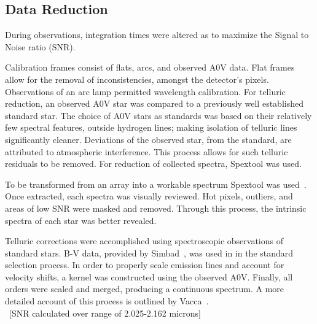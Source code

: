 \subsection{Data Reduction}

During observations, integration times were altered as to maximize the Signal to Noise ratio (SNR).

Calibration frames consist of flats, arcs, and observed A0V data.  Flat frames allow for the removal of inconsistencies, amongst the detector's pixels.  Observations of an arc lamp permitted wavelength calibration.  For telluric reduction, an observed A0V star was compared to a previously well established standard star.  The choice of A0V stars as standards was based on their relatively few spectral features, outside hydrogen lines; making isolation of telluric lines significantly cleaner.  
Deviations of the observed star, from the standard, are attributed to atmospheric interference.  This process allows for such telluric residuals to be removed.  For reduction of collected spectra, Spextool was used.





To be transformed from an array into a workable spectrum Spextool was used~\cite{Cushing_2004}.  Once extracted, each spectra was visually reviewed.  Hot pixels, outliers, and areas of low SNR were masked and removed.  Through this process, the intrinsic spectra of each star was better revealed.


Telluric corrections were accomplished using spectroscopic observations of standard stars. B-V data, provided by Simbad~\cite{simbad}, was used in in the standard selection process.
In order to properly scale emission lines and account for velocity shifts, a kernel was constructed using the observed A0V.  Finally, all orders were scaled and merged, producing a continuous spectrum.
A more detailed account of this process is outlined by Vacca~\cite{Vacca_2003}.\\



~[SNR calculated over range of 2.025-2.162 microns]\\